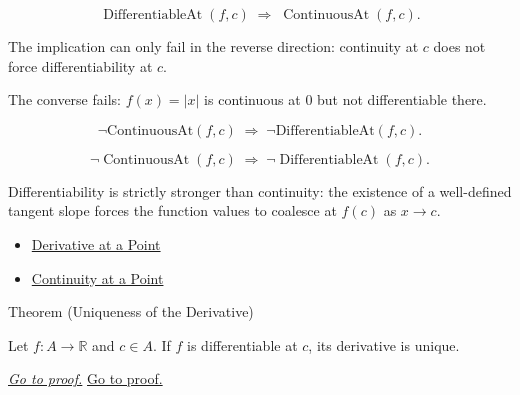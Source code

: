 \begin{remark*}
\[
\operatorname{DifferentiableAt}(f,c)
\;\Longrightarrow\;
\operatorname{ContinuousAt}(f,c).
\]
\end{remark*}

\begin{remark*}
The implication can only fail in the reverse direction: continuity at $c$
does not force differentiability at $c$.
\end{remark*}

\begin{remark*}
The converse fails: $f(x) = |x|$ is continuous at $0$ but not differentiable there.
\end{remark*}

\begin{remark*}
\[
\neg \text{ContinuousAt}(f,c) \;\Rightarrow\; \neg \text{DifferentiableAt}(f,c).
\]
\end{remark*}

\begin{remark*}
\[
\neg\operatorname{ContinuousAt}(f,c)
\;\Longrightarrow\;
\neg\operatorname{DifferentiableAt}(f,c).
\]
\end{remark*}

\begin{remark*}[Interpretation]
Differentiability is strictly stronger than continuity: the existence of a well-defined tangent slope forces the function values to coalesce at $f(c)$ as $x \to c$.
\end{remark*}

\begin{dependencies}
\begin{itemize}
  \item \hyperref[def:derivative-at-a-point]{Derivative at a Point}
  \item \hyperref[def:continuous-at-point]{Continuity at a Point}
\end{itemize}
\end{dependencies}


\begin{theorembox}{Theorem (Uniqueness of the Derivative)}
\begin{theorem}
\label{thm:uniqueness-of-the-derivative}
Let $f : A \to \mathbb{R}$ and $c \in A$. If $f$ is differentiable at $c$, its derivative is unique.

\smallskip\noindent
\hyperref[prf:uniqueness-of-derivative]{\textit{Go to proof.}}
\hyperref[prf:uniqueness-of-the-derivative]{Go to proof.}
\end{theorem}
\end{theorembox}

